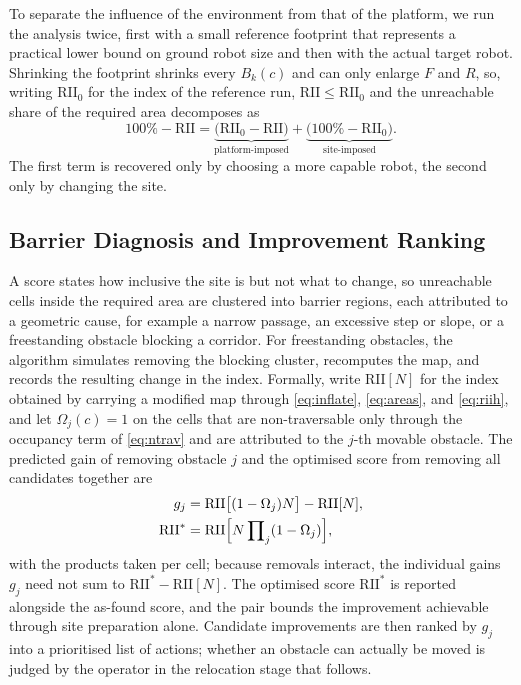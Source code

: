 \documentclass[a4paper, 10pt, conference]{ieeeconf}
\begin{document}
To separate the influence of the environment from that of the platform, we run the analysis twice, first with a small reference footprint that represents a practical lower bound on ground robot size and then with the actual target robot. Shrinking the footprint shrinks every $B_{k}(c)$ and can only enlarge $F$ and $R$, so, writing $\mathrm{RII}_{0}$ for the index of the reference run, $\mathrm{RII} \le \mathrm{RII}_{0}$ and the unreachable share of the required area decomposes as
\begin{equation}
100\% - \mathrm{RII} = \underbrace{\bigl(\mathrm{RII}_{0} - \mathrm{RII}\bigr)}_{\text{platform-imposed}} + \underbrace{\bigl(100\% - \mathrm{RII}_{0}\bigr)}_{\text{site-imposed}}.
\label{eq:decomp}
\end{equation}
The first term is recovered only by choosing a more capable robot, the second only by changing the site.
 
\subsection{Barrier Diagnosis and Improvement Ranking}
\label{sec:barriers}
A score states how inclusive the site is but not what to change, so unreachable cells inside the required area are clustered into barrier regions, each attributed to a geometric cause, for example a narrow passage, an excessive step or slope, or a freestanding obstacle blocking a corridor. For freestanding obstacles, the algorithm simulates removing the blocking cluster, recomputes the map, and records the resulting change in the index. Formally, write $\mathrm{RII}[N]$ for the index obtained by carrying a modified map through \eqref{eq:inflate}, \eqref{eq:areas}, and \eqref{eq:riih}, and let $\Omega_{j}(c)=1$ on the cells that are non-traversable only through the occupancy term of \eqref{eq:ntrav} and are attributed to the $j$-th movable obstacle. The predicted gain of removing obstacle $j$ and the optimised score from removing all candidates together are
\begin{equation}
\begin{split}
g_{j} &= \mathrm{RII}\bigl[(1-\Omega_{j})N\bigr] - \mathrm{RII}[N],\\
\mathrm{RII}^{\ast} &= \mathrm{RII}\Bigl[N \prod\nolimits_{j}(1-\Omega_{j})\Bigr],
\end{split}
\label{eq:gain}
\end{equation}
with the products taken per cell; because removals interact, the individual gains $g_{j}$ need not sum to $\mathrm{RII}^{\ast} - \mathrm{RII}[N]$. The optimised score $\mathrm{RII}^{\ast}$ is reported alongside the as-found score, and the pair bounds the improvement achievable through site preparation alone. Candidate improvements are then ranked by $g_{j}$ into a prioritised list of actions; whether an obstacle can actually be moved is judged by the operator in the relocation stage that follows.
 
\end{document}
